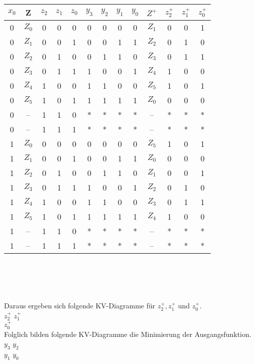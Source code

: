 \documentclass[11pt,a4paper]{article}
\begin{document}
\begin{tabular}{c | c | c | c | c | | c | c | c | c | | c | c | c | c}
$x_0$&Z&$z_2$&$z_1$&$z_0$&$y_3$&$y_2$&$y_1$&$y_0$&$Z^+$&$z^+_2$&$z^+_1$&$z^+_0$ \\ \hline
0&$Z_0$&0&0&0&0&0&0&0&$Z_1$&0&0&1\\
0&$Z_1$&0&0&1&0&0&1&1&$Z_2$&0&1&0\\
0&$Z_2$&0&1&0&0&1&1&0&$Z_3$&0&1&1\\
0&$Z_3$&0&1&1&1&0&0&1&$Z_4$&1&0&0\\
0&$Z_4$&1&0&0&1&1&0&0&$Z_5$&1&0&1\\
0&$Z_5$&1&0&1&1&1&1&1&$Z_0$&0&0&0\\
0&--&1&1&0&*&*&*&*&--&*&*&*\\
0&--&1&1&1&*&*&*&*&--&*&*&*\\ \hline
1&$Z_0$&0&0&0&0&0&0&0&$Z_5$&1&0&1\\
1&$Z_1$&0&0&1&0&0&1&1&$Z_0$&0&0&0\\
1&$Z_2$&0&1&0&0&1&1&0&$Z_1$&0&0&1\\
1&$Z_3$&0&1&1&1&0&0&1&$Z_2$&0&1&0\\
1&$Z_4$&1&0&0&1&1&0&0&$Z_3$&0&1&1\\
1&$Z_5$&1&0&1&1&1&1&1&$Z_4$&1&0&0\\
1&--&1&1&0&*&*&*&*&--&*&*&*\\
1&--&1&1&1&*&*&*&*&--&*&*&*\\
\end{tabular}\\
\\ \\  \\
Daraus ergeben sich folgende KV-Diagramme für $z^+_2,z^+_1$ und $z^+_0$.\\
$z^+_2$
$z^+_1$
\\
$z^+_0$
\\ \newpage
Folglich bilden folgende KV-Diagramme die Minimierung der Ausgangsfunktion.\\
$y_3$
$y_2$
\\
$y_1$
$y_0$
\\ 
\end{document}
